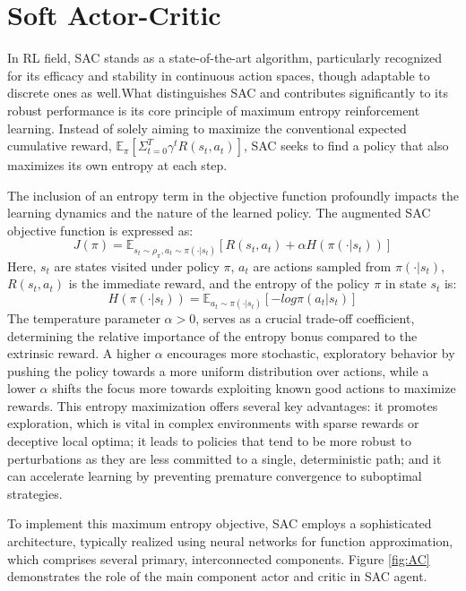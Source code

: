 \section{Soft Actor-Critic}
\label{sec:sac}
In \gls{RL} field, \gls{SAC} stands as a state-of-the-art algorithm, particularly recognized for its efficacy and stability in continuous action spaces, though adaptable to discrete ones as well.What distinguishes \gls{SAC} and contributes significantly to its robust performance is its core principle of maximum entropy reinforcement learning. Instead of solely aiming to maximize the conventional expected cumulative reward, \(\mathbb{E}_\pi[\Sigma_{t=0}^T \gamma^t R(s_t, a_t)]\), \gls{SAC} seeks to find a policy that also maximizes its own entropy at each step.

The inclusion of an entropy term in the objective function profoundly impacts the learning dynamics and the nature of the learned policy. The augmented \gls{SAC} objective function is expressed as:
\[J(\pi) = \mathbb{E}_{s_t \sim \rho_\pi, a_t \sim \pi(\cdot|s_t)} [R(s_t, a_t) + \alpha H(\pi(\cdot|s_t))]\]
Here, \(s_t\) are states visited under policy \(\pi\), \(a_t\) are actions sampled from \(\pi(\cdot|s_t)\), \(R(s_t, a_t)\) is the immediate reward, and the entropy of the policy \(\pi\) in state \(s_t\) is:
\[H(\pi(\cdot|s_t)) = \mathbb{E}_{a_t \sim \pi(\cdot|s_t)}[-log \pi(a_t|s_t)]\]
The temperature parameter \(\alpha > 0\), serves as a crucial trade-off coefficient, determining the relative importance of the entropy bonus compared to the extrinsic reward. A higher \(\alpha\) encourages more stochastic, exploratory behavior by pushing the policy towards a more uniform distribution over actions, while a lower \(\alpha\) shifts the focus more towards exploiting known good actions to maximize rewards. This entropy maximization offers several key advantages: it promotes exploration, which is vital in complex environments with sparse rewards or deceptive local optima; it leads to policies that tend to be more robust to perturbations as they are less committed to a single, deterministic path; and it can accelerate learning by preventing premature convergence to suboptimal strategies.

To implement this maximum entropy objective, \gls{SAC} employs a sophisticated architecture, typically realized using neural networks for function approximation, which comprises several primary, interconnected components. Figure \ref{fig:AC} demonstrates the role of the main component actor and critic in \gls{SAC} agent.

